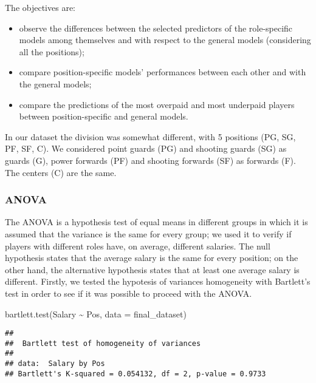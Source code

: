 \documentclass[
]{article}
\newenvironment{Shaded}{\begin{snugshade}}{\end{snugshade}}
\newcommand{\AttributeTok}[1]{\textcolor[rgb]{0.77,0.63,0.00}{#1}}
\newcommand{\FunctionTok}[1]{\textcolor[rgb]{0.00,0.00,0.00}{#1}}
\newcommand{\NormalTok}[1]{#1}
\newcommand{\SpecialCharTok}[1]{\textcolor[rgb]{0.00,0.00,0.00}{#1}}
\begin{document}
The objectives are:

\begin{itemize}
\item
  observe the differences between the selected predictors of the
  role-specific models among themselves and with respect to the general
  models (considering all the positions);
\item
  compare position-specific models' performances between each other and
  with the general models;
\item
  compare the predictions of the most overpaid and most underpaid
  players between position-specific and general models.
\end{itemize}

In our dataset the division was somewhat different, with 5 positions
(PG, SG, PF, SF, C). We considered point guards (PG) and shooting guards
(SG) as guards (G), power forwards (PF) and shooting forwards (SF) as
forwards (F). The centers (C) are the same.

\hypertarget{anova}{%
\subsubsection{ANOVA}\label{anova}}

The ANOVA is a hypothesis test of equal means in different groups in
which it is assumed that the variance is the same for every group; we
used it to verify if players with different roles have, on average,
different salaries. The null hypothesis states that the average salary
is the same for every position; on the other hand, the alternative
hypothesis states that at least one average salary is different.
Firstly, we tested the hypotesis of variances homogeneity with
Bartlett's test in order to see if it was possible to proceed with the
ANOVA.

\begin{Shaded}
\begin{Highlighting}[]
\FunctionTok{bartlett.test}\NormalTok{(Salary }\SpecialCharTok{\textasciitilde{}}\NormalTok{ Pos, }\AttributeTok{data =}\NormalTok{ final\_dataset)}
\end{Highlighting}
\end{Shaded}

\begin{verbatim}
## 
##  Bartlett test of homogeneity of variances
## 
## data:  Salary by Pos
## Bartlett's K-squared = 0.054132, df = 2, p-value = 0.9733
\end{verbatim}
\end{document}
